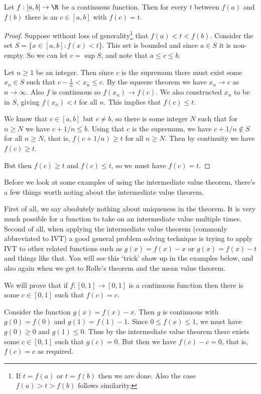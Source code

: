 \begin{theorem}
	Let $f: [a, b] \rightarrow \R$ be a continuous function. Then for every $t$ between $f(a)$ and $f(b)$ there is an $c \in [a, b]$ with $f(c) = t$.
\end{theorem}
\begin{proof}
Suppose without loss of generality\footnote{If $t = f(a)$ or $t = f(b)$ then we are done. Also the case $f(a)> t> f(b)$ follows similarity.} that $f(a) < t < f(b)$. Consider the set $S = \{x \in [a, b] : f(x) < t\}$. This set is bounded and since $a \in S$ it is non-empty. So we can let $c = \sup S$, and note that $a \leq c \leq b$.

Let $n \geq 1$ be an integer. Then since $c$ is the supremum there must exist some $x_n \in S$ such that $c - \frac{1}{n} < x_n \leq c$. 
By the squeeze theorem we have $x_n \rightarrow c$ as $n \rightarrow \infty$.
Also $f$ is continuous so $f(x_n) \rightarrow f(c)$. 
We also constructed $x_n$ to be in $S$, giving $f(x_n) < t$ for all $n$. This implies that $f(c) \leq t$. 

We know that $c \in [a, b]$ but $c \neq b$, so there is some integer $N$ such that for $n \geq N$ we have $c + 1/n \leq b$.
Using that $c$ is the supremum, we have $c + 1/n \not \in S$ for all $n \geq N$, that is, $f(c + 1/n) \geq t$ for all $n\geq N$.
Then by continuity we have $f(c) \geq t$. 

But then $f(c) \geq t$ and $f(c) \leq t$, so we must have $f(c) = t$.
\end{proof}

Before we look at some examples of using the intermediate value theorem, there's a few things worth noting about the intermediate value theorem.

First of all, we say absolutely nothing about uniqueness in the theorem. It is very much possible for a function to take on an intermediate value multiple times.
Second of all, when applying the intermediate value theorem (commonly abbreviated to IVT) a good general problem solving technique is trying to apply IVT to other related functions such as $g(x) = f(x) - x$ or $g(x) = f(x) - t$ and things like that. You will see this `trick' show up in the examples below, and also again when we get to Rolle's theorem and the mean value theorem.


\begin{example}
	We will prove that if $f:[0, 1] \rightarrow [0, 1]$ is a continuous function then there is some $c \in [0, 1]$ such that $f(c)=c$.

	Consider the function $g(x) = f(x) - x$. Then $g$ is continuous with $g(0) = f(0)$ and $g(1) = f(1) - 1$. 
	Since $0 \leq f(x) \leq 1$, we must have $g(0) \geq 0$ and $g(1) \leq 0$. Thus by the intermediate value theorem there exists some $c \in [0, 1]$ such that $g(c) = 0$. But then we have $f(c) - c = 0$, that is, $f(c) = c$ as required.
\end{example}

